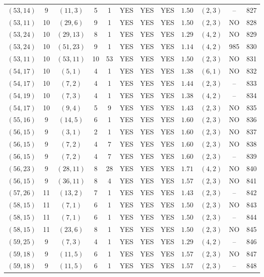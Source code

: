 \begin{longtable}{|c|c|c|c|c|c|c|c|c|c|c|c|}
$(53,14)$ & 9 & $(11,3)$ & 5 & 1 & YES & YES & YES & $1.50$ & $(2,3)$ & -- & 827\\
$(53,11)$ & 10 & $(29,6)$ & 9 & 1 & YES & YES & YES & $1.50$ & $(2,3)$ & NO & 828\\
$(53,24)$ & 10 & $(29,13)$ & 8 & 1 & YES & YES & YES & $1.29$ & $(4,2)$ & NO & 829\\
$(53,24)$ & 10 & $(51,23)$ & 9 & 1 & YES & YES & YES & $1.14$ & $(4,2)$ & 985 & 830\\
$(53,11)$ & 10 & $(53,11)$ & 10 & 53 & YES & YES & YES & $1.50$ & $(2,3)$ & NO & 831\\
$(54,17)$ & 10 & $(5,1)$ & 4 & 1 & YES & YES & YES & $1.38$ & $(6,1)$ & NO & 832\\
$(54,17)$ & 10 & $(7,2)$ & 4 & 1 & YES & YES & YES & $1.44$ & $(2,3)$ & -- & 833\\
$(54,19)$ & 10 & $(7,3)$ & 4 & 1 & YES & YES & YES & $1.38$ & $(4,2)$ & -- & 834\\
$(54,17)$ & 10 & $(9,4)$ & 5 & 9 & YES & YES & YES & $1.43$ & $(2,3)$ & NO & 835\\
$(55,16)$ & 9 & $(14,5)$ & 6 & 1 & YES & YES & YES & $1.60$ & $(2,3)$ & NO & 836\\
$(56,15)$ & 9 & $(3,1)$ & 2 & 1 & YES & YES & YES & $1.60$ & $(2,3)$ & NO & 837\\
$(56,15)$ & 9 & $(7,2)$ & 4 & 7 & YES & YES & YES & $1.60$ & $(2,3)$ & NO & 838\\
$(56,15)$ & 9 & $(7,2)$ & 4 & 7 & YES & YES & YES & $1.60$ & $(2,3)$ & -- & 839\\
$(56,23)$ & 9 & $(28,11)$ & 8 & 28 & YES & YES & YES & $1.71$ & $(4,2)$ & NO & 840\\
$(56,15)$ & 9 & $(36,11)$ & 8 & 4 & YES & YES & YES & $1.57$ & $(2,3)$ & NO & 841\\
$(57,26)$ & 11 & $(13,2)$ & 7 & 1 & YES & YES & YES & $1.43$ & $(2,3)$ & -- & 842\\
$(58,15)$ & 11 & $(7,1)$ & 6 & 1 & YES & YES & YES & $1.50$ & $(2,3)$ & NO & 843\\
$(58,15)$ & 11 & $(7,1)$ & 6 & 1 & YES & YES & YES & $1.50$ & $(2,3)$ & -- & 844\\
$(58,15)$ & 11 & $(23,6)$ & 8 & 1 & YES & YES & YES & $1.50$ & $(2,3)$ & NO & 845\\
$(59,25)$ & 9 & $(7,3)$ & 4 & 1 & YES & YES & YES & $1.29$ & $(4,2)$ & -- & 846\\
$(59,18)$ & 9 & $(11,5)$ & 6 & 1 & YES & YES & YES & $1.57$ & $(2,3)$ & NO & 847\\
$(59,18)$ & 9 & $(11,5)$ & 6 & 1 & YES & YES & YES & $1.57$ & $(2,3)$ & -- & 848\\

\end{longtable}
